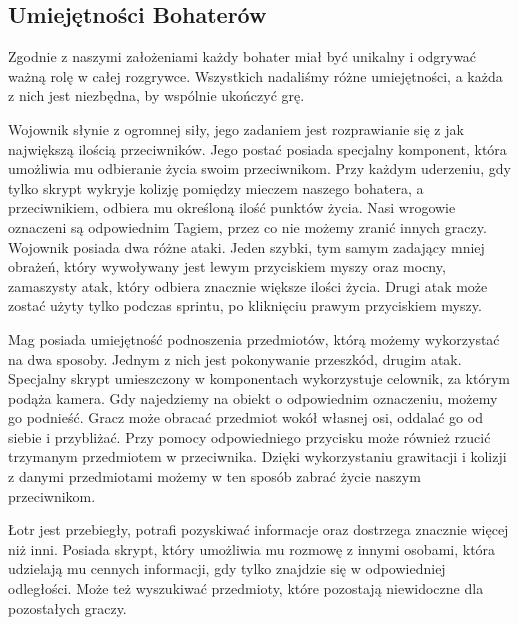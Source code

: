 \subsection{Umiejętności Bohaterów}
Zgodnie z naszymi założeniami każdy bohater miał być unikalny i odgrywać ważną rolę w całej rozgrywce. Wszystkich nadaliśmy różne umiejętności, a każda z nich jest niezbędna, by wspólnie ukończyć grę.

Wojownik słynie z ogromnej siły, jego zadaniem jest rozprawianie się z jak największą ilością przeciwników. Jego postać posiada specjalny komponent, która umożliwia mu odbieranie życia swoim przeciwnikom. Przy każdym uderzeniu, gdy tylko skrypt wykryje kolizję pomiędzy mieczem naszego bohatera, a przeciwnikiem, odbiera mu określoną ilość punktów życia. Nasi wrogowie oznaczeni są odpowiednim Tagiem, przez co nie możemy zranić innych graczy.
Wojownik posiada dwa różne ataki.  Jeden szybki, tym samym zadający mniej obrażeń, który wywoływany jest lewym przyciskiem myszy oraz mocny, zamaszysty atak, który odbiera znacznie większe ilości życia. Drugi atak może zostać użyty tylko podczas sprintu, po kliknięciu prawym przyciskiem myszy.

Mag posiada umiejętność podnoszenia przedmiotów, którą możemy wykorzystać na dwa sposoby. Jednym z nich jest pokonywanie przeszkód, drugim atak. Specjalny skrypt umieszczony w komponentach wykorzystuje celownik, za którym podąża kamera. Gdy najedziemy na obiekt o odpowiednim oznaczeniu, możemy go podnieść. Gracz może obracać przedmiot wokół własnej osi, oddalać go od siebie i przybliżać. Przy pomocy odpowiedniego przycisku może również rzucić trzymanym przedmiotem w przeciwnika. Dzięki wykorzystaniu grawitacji i kolizji z danymi przedmiotami możemy w ten sposób zabrać życie naszym przeciwnikom.

Łotr jest przebiegły, potrafi pozyskiwać informacje oraz dostrzega znacznie więcej niż inni. Posiada skrypt, który umożliwia mu rozmowę z innymi osobami, która udzielają mu cennych informacji, gdy tylko znajdzie się w odpowiedniej odległości. Może też wyszukiwać przedmioty, które pozostają niewidoczne dla pozostałych graczy.
